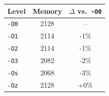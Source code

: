 \begin{tabular*}{\columnwidth}{@{\extracolsep\fill}lcc@{\extracolsep\fill}}
\toprule
\textbf{Level} & \textbf{Memory} & \textbf{$\Delta$ vs.\ \texttt{-O0}} \\
\midrule
\texttt{-O0} & 2128 & -- \\
\texttt{-O1} & 2114 & -1\% \\
\texttt{-O2} & 2114 & -1\% \\
\texttt{-O3} & 2082 & -2\% \\
\texttt{-Os} & 2068 & -3\% \\
\texttt{-Oz} & 2128 & +0\% \\
\bottomrule
\end{tabular*}
